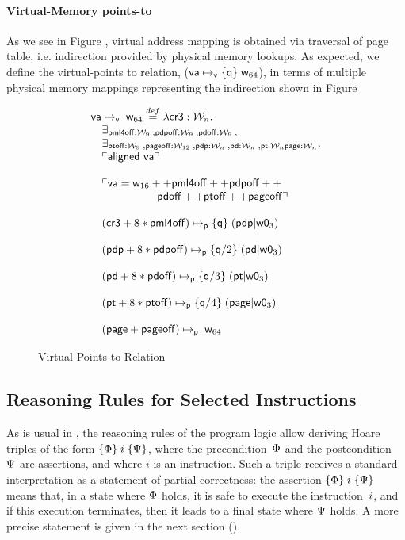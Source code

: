 \paragraph{Virtual-Memory points-to} As we see in Figure , virtual address mapping is obtained via traversal of page table, i.e. indirection provided by physical memory lookups. As expected, we define the virtual-points to relation, ($\mathsf{va}\mapsto_{\mathsf{v}}\{\mathsf{q}\}\;\mathsf{w}_{64}$), in terms of multiple physical memory mappings representing the indirection shown in Figure 
\begin{figure}
\[
\begin{array}{l}
  \mathsf{va}\mapsto_{\mathsf{v}}\;\mathsf{w}_{64} \stackrel{def}{=} \lambda \mathsf{cr3}:\mathcal{W}_n.\\
  \quad \exists_{\mathsf{pml4off}:\mathcal{W}_{9} \;, \mathsf{pdpoff}:\mathcal{W}_{9} \;, \mathsf{pdoff}:\mathcal{W}_{9} \;,} \\
  \quad \exists_{\mathsf{ptoff}:\mathcal{W}_{9} \;, \mathsf{pageoff}:\mathcal{W}_{12} \;, \mathsf{pdp}:\mathcal{W}_n \;, \mathsf{pd}:\mathcal{W}_n \;, \mathsf{pt}:\mathcal{W}_n \mathsf{page}:\mathcal{W}_n} \ldotp\\
  \quad \ulcorner \textsf{aligned } \mathsf{va} \urcorner \\\\
  \quad \ulcorner \mathsf{va} = \mathsf{w}_{16} ++ \mathsf{pml4off} ++ \mathsf{pdpoff} ++ \\
  \qquad\qquad \qquad \mathsf{pdoff} ++ \mathsf{ptoff} ++ \mathsf{pageoff} \urcorner \\\\
  \quad  (\mathsf{cr3}+8*\mathsf{pml4off})\mapsto_{\mathsf{p}}\{\mathsf{q}\}\;(\mathsf{pdp} | \mathsf{w0}_{3}) \\ \\
  \quad  (\mathsf{pdp}+8*\mathsf{pdpoff})\mapsto_{\mathsf{p}}\{\mathsf{q}/2\}\;(\mathsf{pd} | \mathsf{w0}_{3}) \\ \\
  \quad (\mathsf{pd}+8*\mathsf{pdoff})\mapsto_{\mathsf{p}}\{\mathsf{q}/3\}\;(\mathsf{pt} | \mathsf{w0}_{3}) \\ \\
  \quad (\mathsf{pt}+8*\mathsf{ptoff})\mapsto_{\mathsf{p}}\{\mathsf{q}/4\}\;(\mathsf{page} | \mathsf{w0}_{3}) \\ \\
  \quad (\mathsf{page}+\mathsf{pageoff})\mapsto_{\mathsf{p}}\;\mathsf{w}_{64} 
\end{array}
\]
\caption{Virtual Points-to Relation}
  \label{fig:virtualpointsto}
\end{figure}
\subsection{Reasoning Rules for Selected Instructions}
\label{sec:reasoning}

As is usual in \SL, the reasoning rules of the program logic allow deriving
Hoare triples of the form $\{\Phi\}\;i\;\{\Psi\}$, where the
precondition~$\Phi$ and the postcondition~$\Psi$ are assertions,
and where $i$ is an instruction.
Such a triple receives a standard interpretation as a statement of partial
correctness: the assertion $\{\Phi\}\;i\;\{\Psi\}$ means that, in a state
where $\Phi$ holds, it is safe to execute the instruction~$i$, and if
this execution terminates, then it leads to a final state where $\Psi$ holds.
A more precise statement is given in the next section ().
